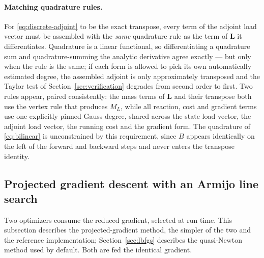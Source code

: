 \documentclass[11pt]{article}
\begin{document}
\paragraph{Matching quadrature rules.} For \eqref{eq:discrete-adjoint} to be the exact transpose, every term of the adjoint load vector must be assembled with the \emph{same} quadrature rule as the term of $\mathbf{L}$ it differentiates. Quadrature is a linear functional, so differentiating a quadrature sum and quadrature-summing the analytic derivative agree exactly --- but only when the rule is the same; if each form is allowed to pick its own automatically estimated degree, the assembled adjoint is only approximately transposed and the Taylor test of Section~\ref{sec:verification} degrades from second order to first. Two rules appear, paired consistently: the mass terms of $\mathbf{L}$ and their transpose both use the vertex rule that produces $M_L$, while all reaction, cost and gradient terms use one explicitly pinned Gauss degree, shared across the state load vector, the adjoint load vector, the running cost and the gradient form. The quadrature of \eqref{eq:bilinear} is unconstrained by this requirement, since $B$ appears identically on the left of the forward and backward steps and never enters the transpose identity.

\subsection{Projected gradient descent with an Armijo line search}
\label{sec:algorithm}

Two optimizers consume the reduced gradient, selected at run time. This subsection describes the projected-gradient method, the simpler of the two and the reference implementation; Section~\ref{sec:lbfgs} describes the quasi-Newton method used by default. Both are fed the identical gradient.
\end{document}
